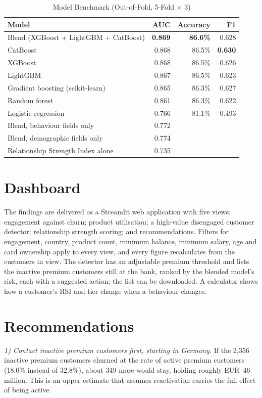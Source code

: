 \documentclass[10pt,twocolumn,letterpaper]{article}
\begin{document}
\begin{table}[t]
\caption{Model Benchmark (Out-of-Fold, 5-Fold $\times$ 3)}\label{tab:model}
\centering\footnotesize
\begin{tabular}{@{}lrrr@{}}
\toprule
Model & AUC & Accuracy & F1\\
\midrule
Blend (XGBoost + LightGBM + CatBoost) & \textbf{0.869} & \textbf{86.6\%} & 0.628\\
CatBoost & 0.868 & 86.5\% & \textbf{0.630}\\
XGBoost & 0.868 & 86.5\% & 0.626\\
LightGBM & 0.867 & 86.5\% & 0.623\\
Gradient boosting (scikit-learn) & 0.865 & 86.3\% & 0.627\\
Random forest & 0.861 & 86.3\% & 0.622\\
Logistic regression & 0.766 & 81.1\% & 0.493\\
\midrule
Blend, behaviour fields only & 0.772 & & \\
Blend, demographic fields only & 0.774 & & \\
Relationship Strength Index alone & 0.735 & & \\
\bottomrule
\end{tabular}
\end{table}

\section{Dashboard}
The findings are delivered as a Streamlit web application with five views: engagement against churn; product utilisation; a high-value disengaged customer detector; relationship strength scoring; and recommendations. Filters for engagement, country, product count, minimum balance, minimum salary, age and card ownership apply to every view, and every figure recalculates from the customers in view. The detector has an adjustable premium threshold and lists the inactive premium customers still at the bank, ranked by the blended model's risk, each with a suggested action; the list can be downloaded. A calculator shows how a customer's RSI and tier change when a behaviour changes.

\section{Recommendations}
\textit{1) Contact inactive premium customers first, starting in Germany.} If the 2,356 inactive premium customers churned at the rate of active premium customers (18.0\% instead of 32.8\%), about 349 more would stay, holding roughly EUR~46 million. This is an upper estimate that assumes reactivation carries the full effect of being active.
\end{document}
